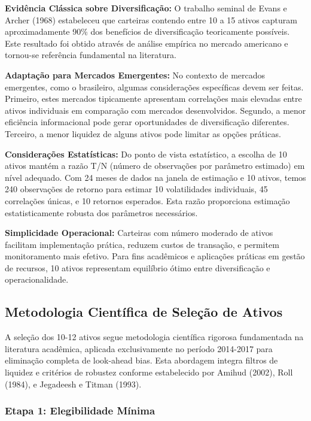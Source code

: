 \textbf{Evidência Clássica sobre Diversificação:} O trabalho seminal de Evans e Archer (1968) estabeleceu que carteiras contendo entre 10 a 15 ativos capturam aproximadamente 90\% dos benefícios de diversificação teoricamente possíveis. Este resultado foi obtido através de análise empírica no mercado americano e tornou-se referência fundamental na literatura.

\textbf{Adaptação para Mercados Emergentes:} No contexto de mercados emergentes, como o brasileiro, algumas considerações específicas devem ser feitas. Primeiro, estes mercados tipicamente apresentam correlações mais elevadas entre ativos individuais em comparação com mercados desenvolvidos. Segundo, a menor eficiência informacional pode gerar oportunidades de diversificação diferentes. Terceiro, a menor liquidez de alguns ativos pode limitar as opções práticas.

\textbf{Considerações Estatísticas:} Do ponto de vista estatístico, a escolha de 10 ativos mantém a razão T/N (número de observações por parâmetro estimado) em nível adequado. Com 24 meses de dados na janela de estimação e 10 ativos, temos 240 observações de retorno para estimar 10 volatilidades individuais, 45 correlações únicas, e 10 retornos esperados. Esta razão proporciona estimação estatisticamente robusta dos parâmetros necessários.

\textbf{Simplicidade Operacional:} Carteiras com número moderado de ativos facilitam implementação prática, reduzem custos de transação, e permitem monitoramento mais efetivo. Para fins acadêmicos e aplicações práticas em gestão de recursos, 10 ativos representam equilíbrio ótimo entre diversificação e operacionalidade.

\subsection{Metodologia Científica de Seleção de Ativos}

A seleção dos 10-12 ativos segue metodologia científica rigorosa fundamentada na literatura acadêmica, aplicada exclusivamente no período 2014-2017 para eliminação completa de look-ahead bias. Esta abordagem integra filtros de liquidez e critérios de robustez conforme estabelecido por Amihud (2002), Roll (1984), e Jegadeesh e Titman (1993).

\subsubsection{Etapa 1: Elegibilidade Mínima}

